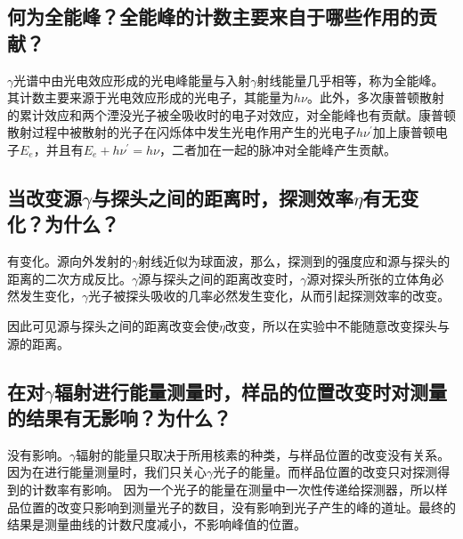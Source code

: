 \documentclass[a4paper]{article}
\begin{document}
\subsection{何为全能峰？全能峰的计数主要来自于哪些作用的贡献？}
$\gamma$光谱中由光电效应形成的光电峰能量与入射$\gamma$射线能量几乎相等，称为全能峰。其计数主要来源于光电效应形成的光电子，其能量为$h\nu$。此外，多次康普顿散射的累计效应和两个湮没光子被全吸收时的电子对效应，对全能峰也有贡献。康普顿散射过程中被散射的光子在闪烁体中发生光电作用产生的光电子$h\nu^{'}$加上康普顿电子$E_e$，并且有$E_e + h\nu^{'} = h\nu$，二者加在一起的脉冲对全能峰产生贡献。

\subsection{当改变源$\gamma$与探头之间的距离时，探测效率$\eta$有无变化？为什么？}
有变化。源向外发射的$\gamma$射线近似为球面波，那么，探测到的强度应和源与探头的距离的二次方成反比。$\gamma$源与探头之间的距离改变时，$\gamma$源对探头所张的立体角必然发生变化，$\gamma$光子被探头吸收的几率必然发生变化，从而引起探测效率的改变。

因此可见源与探头之间的距离改变会使$\eta$改变，所以在实验中不能随意改变探头与源的距离。

\subsection{在对$\gamma$辐射进行能量测量时，样品的位置改变时对测量的结果有无影响？为什么？}
没有影响。$\gamma$辐射的能量只取决于所用核素的种类，与样品位置的改变没有关系。因为在进行能量测量时，我们只关心$\gamma$光子的能量。而样品位置的改变只对探测得到的计数率有影响。
因为一个光子的能量在测量中一次性传递给探测器，所以样品位置的改变只影响到测量光子的数目，没有影响到光子产生的峰的道址。最终的结果是测量曲线的计数尺度减小，不影响峰值的位置。

\nocite{jiaocai}

\end{document}
